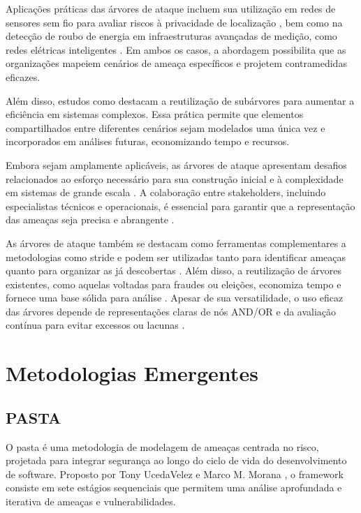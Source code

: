 Aplicações práticas das árvores de ataque incluem sua utilização em
redes de sensores sem fio para avaliar riscos à privacidade de
localização \cite{AnAttackTreeBasedRisk}, bem como na detecção de
roubo de energia em infraestruturas avançadas de medição, como redes
elétricas inteligentes \cite{Energytheftdetectionissues}. Em ambos os
casos, a abordagem possibilita que as organizações mapeiem cenários de
ameaça específicos e projetem contramedidas eficazes.

Além disso, estudos como \cite{FoundationsofAttackTrees} destacam a
reutilização de subárvores para aumentar a eficiência em sistemas
complexos. Essa prática permite que elementos compartilhados entre
diferentes cenários sejam modelados uma única vez e incorporados em
análises futuras, economizando tempo e recursos.

Embora sejam amplamente aplicáveis, as árvores de ataque apresentam
desafios relacionados ao esforço necessário para sua construção
inicial e à complexidade em sistemas de grande escala
\cite{AttackTrees, Energytheftdetectionissues}. A colaboração entre stakeholders, incluindo
especialistas técnicos e operacionais, é essencial para garantir que a
representação das ameaças seja precisa e abrangente
\cite{Energytheftdetectionissues}.

As árvores de ataque também se destacam como ferramentas
complementares a metodologias como \gls{stride} e podem ser utilizadas tanto
para identificar ameaças quanto para organizar as já descobertas
\cite{FoundationsofAttackTrees, ThreatModelingASystematicLiteratureReview}. Além
disso, a reutilização de árvores existentes, como aquelas voltadas
para fraudes ou eleições, economiza tempo e fornece uma base sólida
para análise \cite{FoundationsofAttackTrees}. Apesar de sua versatilidade,
o uso eficaz das árvores depende de representações claras de nós AND/OR
e da avaliação contínua para evitar excessos ou lacunas
\cite{ThreatModelingdesigningForSecurity}.

\section{Metodologias Emergentes}
\label{sec:emerging_methodologies}

\subsection{PASTA}
\label{subsec:pasta}

O \gls{pasta} é uma
metodologia de modelagem de ameaças centrada no risco, projetada para
integrar segurança ao longo do ciclo de vida do desenvolvimento de
software. Proposto por Tony UcedaVelez e Marco M. Morana
\cite{RiskCentricThreatModeling}, o framework consiste em sete
estágios sequenciais que permitem uma análise aprofundada e iterativa
de ameaças e vulnerabilidades.

